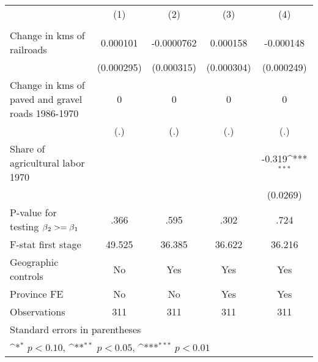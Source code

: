{
\def\sym#1{\ifmmode^{#1}\else\(^{#1}\)\fi}
\begin{tabular}{l*{4}{c}}
\hline\hline
                &\multicolumn{1}{c}{(1)}&\multicolumn{1}{c}{(2)}&\multicolumn{1}{c}{(3)}&\multicolumn{1}{c}{(4)}\\
                &\multicolumn{1}{c}{}&\multicolumn{1}{c}{}&\multicolumn{1}{c}{}&\multicolumn{1}{c}{}\\
\hline
Change in kms of railroads& 0.000101         &-0.0000762         & 0.000158         &-0.000148         \\
                &(0.000295)         &(0.000315)         &(0.000304)         &(0.000249)         \\
[1em]
Change in kms of paved and gravel roads 1986-1970&        0         &        0         &        0         &        0         \\
                &      (.)         &      (.)         &      (.)         &      (.)         \\
[1em]
Share of agricultural labor 1970&                  &                  &                  &   -0.319\sym{***}\\
                &                  &                  &                  & (0.0269)         \\
\hline
P-value for testing $\beta\\_2 >= \beta\\_1$&     .366         &     .595         &     .302         &     .724         \\
F-stat first stage&   49.525         &   36.385         &   36.622         &   36.216         \\
Geographic controls&       No         &      Yes         &      Yes         &      Yes         \\
Province FE     &       No         &       No         &      Yes         &      Yes         \\
Observations    &      311         &      311         &      311         &      311         \\
\hline\hline
\multicolumn{5}{l}{\footnotesize Standard errors in parentheses}\\
\multicolumn{5}{l}{\footnotesize \sym{*} \(p<0.10\), \sym{**} \(p<0.05\), \sym{***} \(p<0.01\)}\\
\end{tabular}
}
